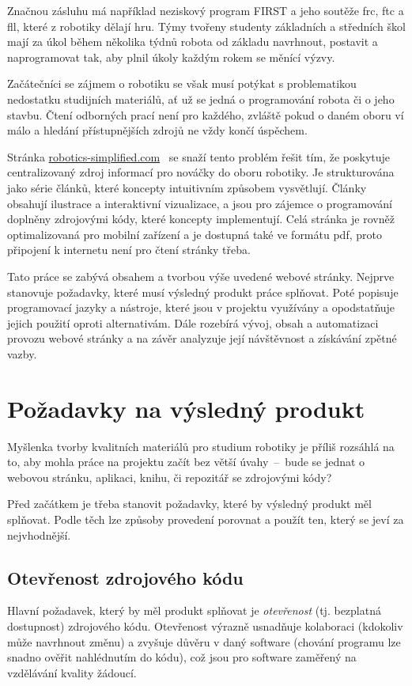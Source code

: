 \documentclass[a4paper, 12pt]{article}
\begin{document}
  Značnou zásluhu má například neziskový program FIRST a jeho soutěže \gls{frc}, \gls{ftc} a \gls{fll}, které z robotiky dělají hru. Týmy tvořeny studenty základních a středních škol mají za úkol během několika týdnů robota od základu navrhnout, postavit a naprogramovat tak, aby plnil úkoly každým rokem se měnící výzvy.

  Začátečníci se zájmem o robotiku se však musí potýkat s problematikou nedostatku studijních materiálů, ať už se jedná o programování robota či o jeho stavbu. Čtení odborných prací není pro každého, zvláště pokud o daném oboru ví málo a hledání přístupnějších zdrojů ne vždy končí úspěchem.

  Stránka \url{robotics-simplified.com}~\cite{robotics-simplified} se snaží tento problém řešit tím, že poskytuje centralizovaný zdroj informací pro nováčky do oboru robotiky. Je strukturována jako série článků, které koncepty intuitivním způsobem vysvětlují. Články obsahují ilustrace a interaktivní vizualizace, a jsou pro zájemce o programování doplněny zdrojovými kódy, které koncepty implementují. Celá stránka je rovněž optimalizovaná pro mobilní zařízení a je dostupná také ve formátu \gls{pdf}, proto připojení k internetu není pro čtení stránky třeba.

  Tato práce se zabývá obsahem a tvorbou výše uvedené webové stránky. Nejprve stanovuje požadavky, které musí výsledný produkt práce splňovat. Poté popisuje programovací jazyky a nástroje, které jsou v projektu využívány a opodstatňuje jejich použití oproti alternativám. Dále rozebírá vývoj, obsah a automatizaci provozu webové stránky a na závěr analyzuje její návštěvnost a získávání zpětné vazby.

  \newpage

  \section{Požadavky na výsledný produkt} \label{sec:Požadavky na výsledný produkt}
  Myšlenka tvorby kvalitních materiálů pro studium robotiky je příliš rozsáhlá na to, aby mohla práce na projektu začít bez větší úvahy~--~bude se jednat o webovou stránku, aplikaci, knihu, či repozitář se zdrojovými kódy?

  Před začátkem je třeba stanovit požadavky, které by výsledný produkt měl splňovat. Podle těch lze způsoby provedení porovnat a použít ten, který se jeví za nejvhodnější.


  \subsection{Otevřenost zdrojového kódu}
  Hlavní požadavek, který by měl produkt splňovat je \emph{otevřenost} (tj. bezplatná dostupnost) zdrojového kódu. Otevřenost výrazně usnadňuje kolaboraci (kdokoliv může navrhnout změnu) a zvyšuje důvěru v daný software (chování programu lze snadno ověřit nahlédnutím do kódu), což jsou pro software zaměřený na vzdělávání kvality žádoucí.
\end{document}
